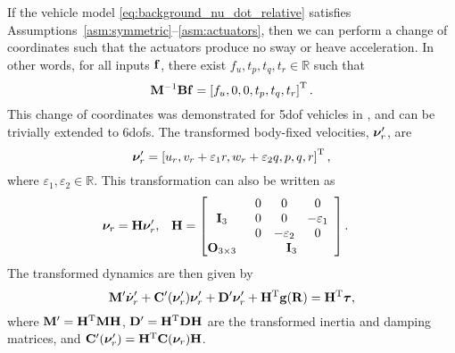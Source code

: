 If the vehicle model \eqref{eq:background_nu_dot_relative} satisfies Assumptions~\ref{asm:symmetric}--\ref{asm:actuators}, then we can perform a change of coordinates such that the actuators produce no sway or heave acceleration.
In other words, for all inputs $\mathbf{f}$, there exist $f_u, t_p, t_q, t_r \in \mathbb{R}$ such that
\begin{equation}
    \mathbf{M}^{-1}\mathbf{B}\mathbf{f} = \left[f_u, 0, 0, t_p, t_q, t_r\right]^{\mathrm{T}}.
    \label{eq:neutral_point_force}
\end{equation}
This change of coordinates was demonstrated for 5\gls{dof} vehicles in \cite{borhaug_straight_2007}, and can be trivially extended to 6\glspl{dof}.
The transformed body-fixed velocities, $\bm{\nu}_r^{\prime}$, are
\begin{equation}
    \bm{\nu}_r^{\prime} = \left[u_r, v_r + \varepsilon_1 r, w_r + \varepsilon_2 q, p, q, r\right]^{\mathrm{T}},
\end{equation}
where $\varepsilon_1, \varepsilon_2 \in \mathbb{R}$.
This transformation can also be written as
\begin{align}
    \bm{\nu}_r &= \mathbf{H}\bm{\nu}_r^{\prime}, &
    \mathbf{H} &=
    \begin{bmatrix}
        { \mathbf{I}_3} & {\begin{array}{ccc} 0 & 0 & 0 \\ 0 & 0 & -\varepsilon_1 \\ 0 & -\varepsilon_2 & 0 \end{array}} \\
        { \mathbf{O}_{3 \times 3}} & {\mathbf{I}_3}
    \end{bmatrix}.
    \label{eq:background_transformation}
\end{align}
The transformed dynamics are then given by
\begin{equation}
    \mathbf{M}^{\prime}\dot{\bm{\nu}}_r^{\prime} + \mathbf{C}^{\prime}(\bm{\nu}^{\prime}_r)\bm{\nu}^{\prime}_r + \mathbf{D}^{\prime}\bm{\nu}^{\prime}_r + \mathbf{H}^{\mathrm{T}}\mathbf{g}(\mathbf{R}) = \mathbf{H}^{\mathrm{T}}\bm{\tau},
\end{equation}
where $\mathbf{M}^{\prime} = \mathbf{H}^{\mathrm{T}} \mathbf{M} \mathbf{H}$, $\mathbf{D}^{\prime} = \mathbf{H}^{\mathrm{T}} \mathbf{D} \mathbf{H}$ are the transformed inertia and damping matrices, and $\mathbf{C}^{\prime}(\bm{\nu}^{\prime}_r) = \mathbf{H}^{\mathrm{T}}\mathbf{C}(\bm{\nu}_r)\mathbf{H}$.

